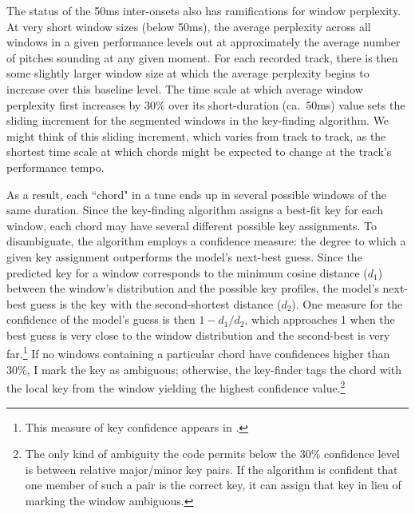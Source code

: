 The status of the 50ms inter-onsets also has ramifications for window perplexity. At very short window sizes (below 50ms), the average perplexity across all windows in a given performance levels out at approximately the average number of pitches sounding at any given moment.  For each recorded track, there is then some slightly larger window size at which the average perplexity begins to increase over this baseline level.  The time scale at which average window perplexity first increases by $30\%$ over its short-duration (ca.\ 50ms) value sets the sliding increment for the segmented windows in the key-finding algorithm.  We might think of this sliding increment, which varies from track to track, as the shortest time scale at which chords might be expected to change at the track's performance tempo. 

As a result, each ``chord" in a tune ends up in several possible windows of the same duration.  Since the key-finding algorithm assigns a best-fit key for each window, each chord may have several different possible key assignments.  To disambiguate, the algorithm employs a confidence measure: the degree to which a given key assignment outperforms the model's next-best guess.  Since the predicted key for a window corresponds to the minimum cosine distance ($d_1$) between the window's distribution and the possible key profiles, the model's next-best guess is the key with the second-shortest distance ($d_2$).  One measure for the confidence of the model's guess is then $1 - d_1/d_2$, which approaches 1 when the best guess is very close to the window distribution and the second-best is very far.\footnote{This measure of key confidence appears in \cite{albrecht2013}.}  If no windows containing a particular chord have confidences higher than $30\%$, I mark the key as ambiguous; otherwise, the key-finder tags the chord with the local key from the window yielding the highest confidence value.\footnote{The only kind of ambiguity the code permits below the $30\%$ confidence level is between relative major/minor key pairs.  If the algorithm is confident that one member of such a pair is the correct key, it can assign that key in lieu of marking the window ambiguous.}

